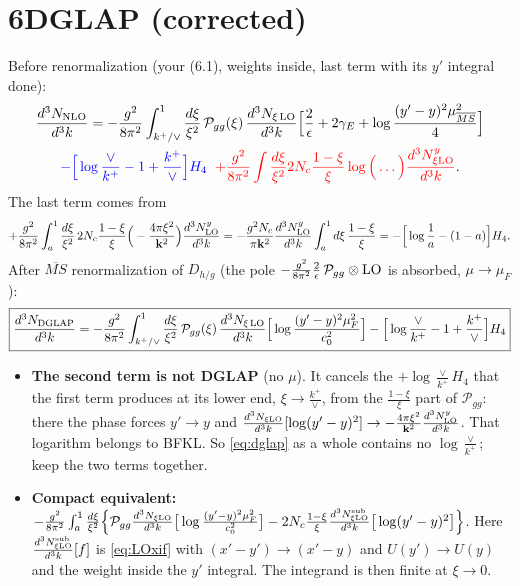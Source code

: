 \documentclass[10pt]{article}
\numberwithin{equation}{section}
\newcommand{\new}[1]{{\color{blue}#1}}
\newcommand{\old}[1]{{\color{red}#1}}
\newcommand{\MSb}{\overline{MS}}
\begin{document}
\section*{6\quad DGLAP (corrected)}
Before renormalization (your (6.1), weights inside, last term with its $y'$ integral done):
\begin{multline}
\frac{d^{3}N_{\rm NLO}}{d^{3}k}=-\frac{g^{2}}{8\pi^{2}}\int_{k^+/\vee}^{1}\frac{d\xi}{\xi^{2}}\,\mathcal P_{gg}(\xi)\,\frac{d^{3}N_{\xi\,\rm LO}}{d^{3}k}\Big[\frac{2}{\epsilon}+2\gamma_{E}+\log\frac{(y'-y)^{2}\mu^{2}_{\MSb}}{4}\Big]\\\new{-\Big[\log\frac{\vee}{k^+}-1+\frac{k^+}{\vee}\Big]H_4}\;\;\old{+\frac{g^2}{8\pi^2}\int\frac{d\xi}{\xi^2}2N_c\frac{1-\xi}{\xi}\log\Big(\dots\Big)\frac{d^3N^y_{\xi\rm LO}}{d^3k}}.\label{eq:dglap0}
\end{multline}
The last term comes from
\begin{equation}
+\frac{g^2}{8\pi^2}\int_a^1\frac{d\xi}{\xi^2}\,2N_c\frac{1-\xi}{\xi}\Big(-\frac{4\pi\xi^2}{\mathbf k^2}\Big)\frac{d^3N^y_{\rm LO}}{d^3k}=-\frac{g^2N_c}{\pi\mathbf k^2}\frac{d^3N^y_{\rm LO}}{d^3k}\int_a^1d\xi\,\frac{1-\xi}{\xi}=-\Big[\log\frac{1}{a}-(1-a)\Big]H_4.\label{eq:last}
\end{equation}
After $\MSb$ renormalization of $D_{h/g}$ (the pole $-\frac{g^2}{8\pi^2}\frac2\epsilon\,\mathcal P_{gg}\otimes{\rm LO}$ is absorbed, $\mu\to\mu_F$):
\begin{equation}
\boxed{\frac{d^{3}N_{\rm DGLAP}}{d^{3}k}=-\frac{g^{2}}{8\pi^{2}}\int_{k^+/\vee}^{1}\frac{d\xi}{\xi^{2}}\,\mathcal P_{gg}(\xi)\,\frac{d^{3}N_{\xi\,\rm LO}}{d^{3}k}\Big[\log\frac{(y'-y)^{2}\mu^{2}_{F}}{c_0^2}\Big]-\Big[\log\frac{\vee}{k^+}-1+\frac{k^+}{\vee}\Big]H_4}\label{eq:dglap}
\end{equation}
\begin{itemize}
\item \textbf{The second term is not DGLAP} (no $\mu$). It cancels the $+\log\frac{\vee}{k^+}H_4$ that the first term produces at its lower end, $\xi\to\frac{k^+}{\vee}$, from the $\frac{1-\xi}{\xi}$ part of $\mathcal P_{gg}$: there the phase forces $y'\to y$ and $\frac{d^3N_{\xi\rm LO}}{d^3k}[\log(y'-y)^2]\to-\frac{4\pi\xi^2}{\mathbf k^2}\frac{d^3N^y_{\rm LO}}{d^3k}$. That logarithm belongs to BFKL. So \eqref{eq:dglap} as a whole contains no $\log\frac{\vee}{k^+}$; keep the two terms together.
\item \textbf{Compact equivalent:} $-\frac{g^2}{8\pi^2}\int_a^1\frac{d\xi}{\xi^2}\Big\{\mathcal P_{gg}\frac{d^3N_{\xi\rm LO}}{d^3k}\big[\log\frac{(y'-y)^2\mu_F^2}{c_0^2}\big]-2N_c\frac{1-\xi}{\xi}\frac{d^3N^{\rm sub}_{\xi\rm LO}}{d^3k}\big[\log(y'-y)^2\big]\Big\}$. Here $\frac{d^3N^{\rm sub}_{\xi\rm LO}}{d^3k}[f]$ is \eqref{eq:LOxif} with $(x'-y')\to(x'-y)$ and $U(y')\to U(y)$ and the weight inside the $y'$ integral. The integrand is then finite at $\xi\to0$.
\end{itemize}
\end{document}
